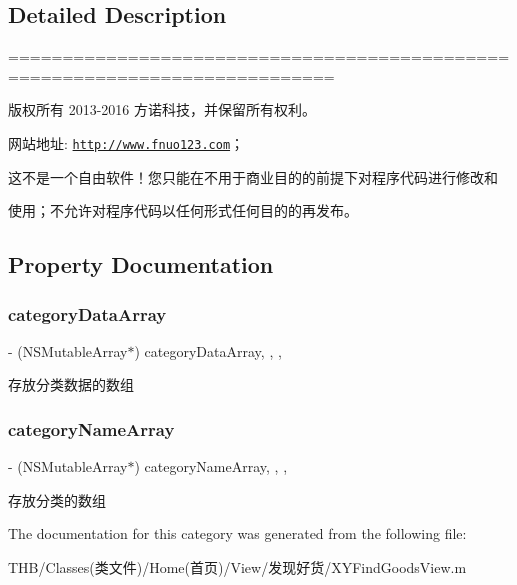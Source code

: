 \subsection{Detailed Description}
============================================================================

版权所有 2013-\/2016 方诺科技，并保留所有权利。

网站地址\+: \href{http://www.fnuo123.com}{\tt http\+://www.\+fnuo123.\+com}； 



这不是一个自由软件！您只能在不用于商业目的的前提下对程序代码进行修改和

使用；不允许对程序代码以任何形式任何目的的再发布。 

 

\subsection{Property Documentation}
\mbox{\label{category_x_y_find_goods_view_07_08_ae211779cebd7da4560d5ba78739cb9f2}} 
\subsubsection{\texorpdfstring{category\+Data\+Array}{categoryDataArray}}
{\footnotesize\ttfamily -\/ (N\+S\+Mutable\+Array$\ast$) category\+Data\+Array\hspace{0.3cm}{\ttfamily [read]}, {\ttfamily [write]}, {\ttfamily [nonatomic]}, {\ttfamily [retain]}}

存放分类数据的数组 \mbox{\label{category_x_y_find_goods_view_07_08_a71c2d4fbb2831ba1ccc871bbd2541b1c}} 
\subsubsection{\texorpdfstring{category\+Name\+Array}{categoryNameArray}}
{\footnotesize\ttfamily -\/ (N\+S\+Mutable\+Array$\ast$) category\+Name\+Array\hspace{0.3cm}{\ttfamily [read]}, {\ttfamily [write]}, {\ttfamily [nonatomic]}, {\ttfamily [retain]}}

存放分类的数组 

The documentation for this category was generated from the following file\+:\begin{DoxyCompactItemize}
\item 
T\+H\+B/\+Classes(类文件)/\+Home(首页)/\+View/发现好货/X\+Y\+Find\+Goods\+View.\+m\end{DoxyCompactItemize}
